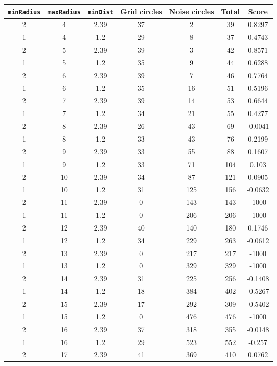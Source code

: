 \documentclass[letterpaper, 12pt]{article}
\begin{document}
\begin{longtable}{|c|c|c|c|c|c|c|}
\hline
\textbf{\texttt{minRadius}} & \textbf{\texttt{maxRadius}} & \textbf{\texttt{minDist}} & \textbf{Grid circles} & \textbf{Noise circles} & \textbf{Total} & \textbf{Score} \\
\hline
2 & 4 & 2.39 & 37 & 2 & 39 & 0.8297 \\
\hline
1 & 4 & 1.2 & 29 & 8 & 37 & 0.4743 \\
\hline
2 & 5 & 2.39 & 39 & 3 & 42 & 0.8571 \\
\hline
1 & 5 & 1.2 & 35 & 9 & 44 & 0.6288 \\
\hline
2 & 6 & 2.39 & 39 & 7 & 46 & 0.7764 \\
\hline
1 & 6 & 1.2 & 35 & 16 & 51 & 0.5196 \\
\hline
2 & 7 & 2.39 & 39 & 14 & 53 & 0.6644 \\
\hline
1 & 7 & 1.2 & 34 & 21 & 55 & 0.4277 \\
\hline
2 & 8 & 2.39 & 26 & 43 & 69 & -0.0041 \\
\hline
1 & 8 & 1.2 & 33 & 43 & 76 & 0.2199 \\
\hline
2 & 9 & 2.39 & 33 & 55 & 88 & 0.1607 \\
\hline
1 & 9 & 1.2 & 33 & 71 & 104 & 0.103 \\
\hline
2 & 10 & 2.39 & 34 & 87 & 121 & 0.0905 \\
\hline
1 & 10 & 1.2 & 31 & 125 & 156 & -0.0632 \\
\hline
2 & 11 & 2.39 & 0 & 143 & 143 & -1000 \\
\hline
1 & 11 & 1.2 & 0 & 206 & 206 & -1000 \\
\hline
2 & 12 & 2.39 & 40 & 140 & 180 & 0.1746 \\
\hline
1 & 12 & 1.2 & 34 & 229 & 263 & -0.0612 \\
\hline
2 & 13 & 2.39 & 0 & 217 & 217 & -1000 \\
\hline
1 & 13 & 1.2 & 0 & 329 & 329 & -1000 \\
\hline
2 & 14 & 2.39 & 31 & 225 & 256 & -0.1408 \\
\hline
1 & 14 & 1.2 & 18 & 384 & 402 & -0.5267 \\
\hline
2 & 15 & 2.39 & 17 & 292 & 309 & -0.5402 \\
\hline
1 & 15 & 1.2 & 0 & 476 & 476 & -1000 \\
\hline
2 & 16 & 2.39 & 37 & 318 & 355 & -0.0148 \\
\hline
1 & 16 & 1.2 & 29 & 523 & 552 & -0.257 \\
\hline
2 & 17 & 2.39 & 41 & 369 & 410 & 0.0762 \\

\end{longtable}
\end{document}
